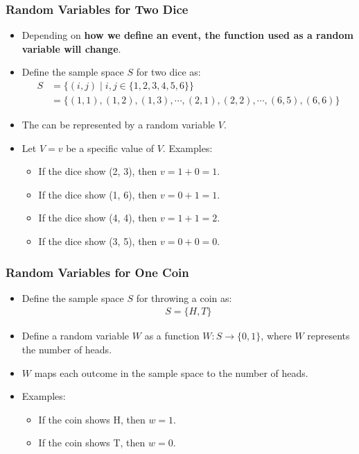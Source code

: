 \documentclass[handout]{beamer} %
\begin{document}
\begin{frame}
    \frametitle{Random Variables for Two Dice}
    \begin{itemize}
        \item Depending on \textbf{how we define an event, the function used as a random variable will change}.
        \item Define the sample space \( S \) for two dice as: \pause
        \begin{align*}
        S &= \big\{(i, j) \mid i, j \in \big\{1, 2, 3, 4, 5, 6\big\}\big\} \\
          &= \big\{(1,1), (1,2), (1,3), \cdots, (2,1), (2,2), \cdots, (6,5), (6,6)\big\}    
        \end{align*} \pause \vspace{-1.5em}
        \item The  can be represented by a random variable \( V \). \pause
        \item Let $V=v$ be a specific value of $V$. Examples: \pause
        \begin{itemize}
            \item If the dice show (2, 3), then \( v = 1 + 0 = 1 \). \pause
            \item If the dice show (1, 6), then \( v = 0 + 1 = 1 \). \pause
            \item If the dice show (4, 4), then \( v = 1 + 1 = 2 \). \pause 
            \item If the dice show (3, 5), then \( v = 0 + 0 = 0 \). \pause
        \end{itemize}
    \end{itemize}
\end{frame}


\begin{frame}
    \frametitle{Random Variables for One Coin}
    \begin{itemize}
        \item Define the sample space \( S \) for throwing a coin as: \pause
        \begin{align*}
        S = \big\{H, T\big\}    
        \end{align*} \pause \vspace{-1.5em}
        \item Define a random variable \( W \) as a function \( W: S \rightarrow \{0, 1\} \), where \( W \) represents the number of heads. \pause
        \item \( W \) maps each outcome in the sample space to the number of heads. \pause
        \item Examples: \pause
        \begin{itemize}
            \item If the coin shows H, then \( w = 1 \). \pause
            \item If the coin shows T, then \( w = 0 \). \pause
        \end{itemize}
    \end{itemize}
\end{frame}
\end{document}
